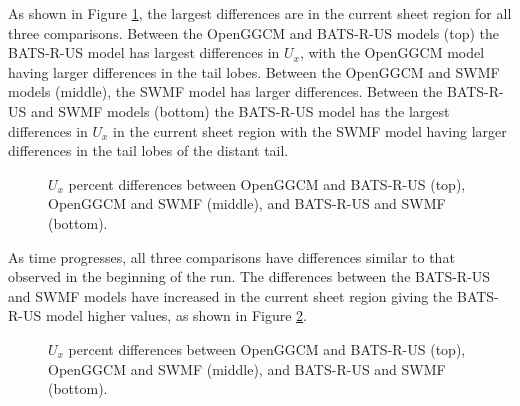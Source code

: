 As shown in Figure \ref{fig:UxDiffHighBeginning}, the largest differences are in
the current sheet region for all three comparisons. Between the OpenGGCM and
BATS-R-US models (top) the BATS-R-US model has largest differences in $U_x$,
with the OpenGGCM model having larger differences in the tail lobes. Between the OpenGGCM and
SWMF models (middle), the SWMF model has larger differences. Between the
BATS-R-US and SWMF models (bottom) the BATS-R-US model has the largest differences in $U_x$ in the
current sheet region with the SWMF model having larger differences in the tail
lobes of the distant tail.
\begin{figure}
	\centering
    \caption{$U_x$ percent differences between OpenGGCM and BATS-R-US (top),
    OpenGGCM and SWMF (middle), and BATS-R-US and SWMF (bottom).
    }
    \label{fig:UxDiffHighBeginning}
	\figSpace
\end{figure}
As time progresses, all three comparisons have differences similar to that observed
in the beginning of the run.  The differences between the BATS-R-US and SWMF
models have increased in the current sheet region giving the BATS-R-US model higher
values, as shown in Figure \ref{fig:UxDiffHighEnd}.
\begin{figure}
	\centering
    \caption{$U_x$ percent differences between OpenGGCM and BATS-R-US (top),
    OpenGGCM and SWMF (middle), and BATS-R-US and SWMF (bottom).
    }
    \label{fig:UxDiffHighEnd}
	\figSpace
\end{figure}

